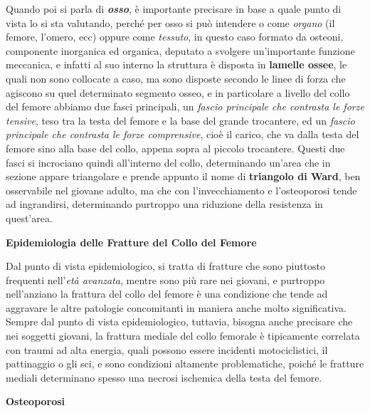 \documentclass[]{article}
\begin{document}
Quando poi si parla di \textbf{\emph{osso}}, è importante precisare in
base a quale punto di vista lo si sta valutando, perché per osso si può
intendere o come \emph{organo} (il femore, l'omero, ecc) oppure come
\emph{tessuto}, in questo caso formato da osteoni, componente inorganica
ed organica, deputato a svolgere un'importante funzione meccanica, e
infatti al suo interno la struttura è disposta in \textbf{lamelle
ossee}, le quali non sono collocate a caso, ma sono disposte secondo le
linee di forza che agiscono su quel determinato segmento osseo, e in
particolare a livello del collo del femore abbiamo due fasci principali,
un \emph{fascio principale che contrasta le forze tensive}, teso tra la
testa del femore e la base del grande trocantere, ed un \emph{fascio
principale che contrasta le forze comprensive}, cioè il carico, che va
dalla testa del femore sino alla base del collo, appena sopra al piccolo
trocantere. Questi due fasci si incrociano quindi all'interno del collo,
determinando un'area che in sezione appare triangolare e prende appunto
il nome di \textbf{triangolo di Ward}, ben osservabile nel giovane
adulto, ma che con l'invecchiamento e l'osteoporosi tende ad
ingrandirsi, determinando purtroppo una riduzione della resistenza in
quest'area.

\textbf{Epidemiologia delle Fratture del Collo del Femore}

Dal punto di vista epidemiologico, si tratta di fratture che sono
piuttosto frequenti nell'\emph{età avanzata}, mentre sono più rare nei
giovani, e purtroppo nell'anziano la frattura del collo del femore è una
condizione che tende ad aggravare le altre patologie concomitanti in
maniera anche molto significativa. Sempre dal punto di vista
epidemiologico, tuttavia, bisogna anche precisare che nei soggetti
giovani, la frattura mediale del collo femorale è tipicamente correlata
con traumi ad alta energia, quali possono essere incidenti
motociclistici, il pattinaggio o gli sci, e sono condizioni altamente
problematiche, poiché le fratture mediali determinano spesso una necrosi
ischemica della testa del femore.

\textbf{Osteoporosi}
\end{document}
